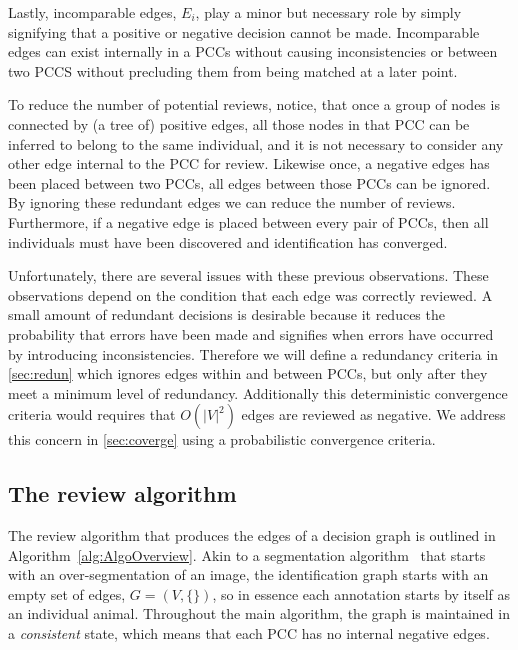 Lastly, incomparable edges, $E_i$, play a minor but necessary role by simply signifying that a positive or negative
decision cannot be made.  Incomparable edges can exist internally in a PCCs without causing inconsistencies or
between two PCCS without precluding them from being matched at a later point.

To reduce the number of potential reviews, notice, that once a group of nodes is connected by (a tree of) positive
edges, all those nodes in that PCC can be inferred to belong to the same individual, and it is not necessary to
consider any other edge internal to the PCC for review. Likewise once, a negative edges has been placed between two
PCCs, all edges between those PCCs can be ignored. By ignoring these redundant edges we can reduce the number of
reviews. Furthermore, if a negative edge is placed between every pair of PCCs, then all individuals must have been
discovered and identification has converged.

Unfortunately, there are several issues with these previous observations. These observations depend on the
condition that each edge was correctly reviewed. A small amount of redundant decisions is desirable because it
reduces the probability that errors have been made and signifies when errors have occurred by introducing
inconsistencies. Therefore we will define a redundancy criteria in \cref{sec:redun} which ignores edges within and
between PCCs, but only after they meet a minimum level of redundancy. Additionally this deterministic convergence
criteria would requires that $O(|V|^2)$ edges are reviewed as negative. We address this concern in
\cref{sec:coverge} using a probabilistic convergence criteria.


\subsection{The review algorithm}


The review algorithm that produces the edges of a decision graph is outlined in Algorithm~\ref{alg:AlgoOverview}.
Akin to a segmentation algorithm~\cite{fulkerson_class_2009} that starts with an over-segmentation of an image, the
identification graph starts with an empty set of edges, $G = (V, \{ \})$, so in essence each annotation starts by
itself as an individual animal. Throughout the main algorithm, the graph is maintained in a \emph{consistent}
state, which means that each PCC has no internal negative edges.

